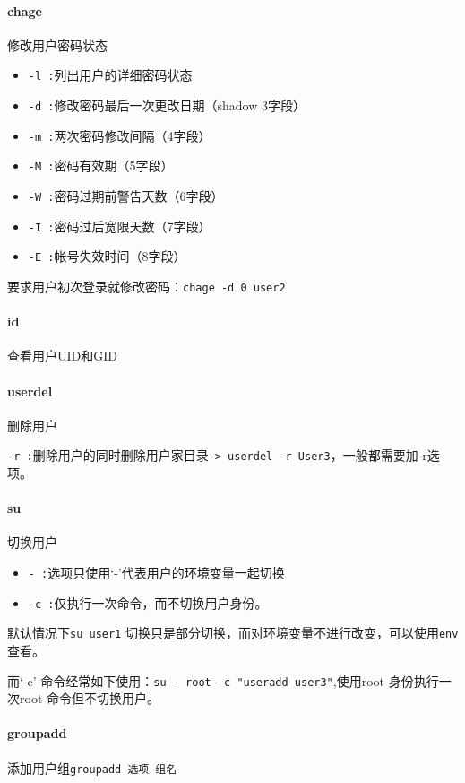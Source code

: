 \documentclass[UTF8,a4paper,12pt]{ctexbook}
\begin{document}
			\paragraph{chage} 修改用户密码状态
				\begin{itemize}[itemindent = 1em]
					\item \verb|-l :|列出用户的详细密码状态
					\item \verb|-d :|修改密码最后一次更改日期（shadow 3字段）
					\item \verb|-m :|两次密码修改间隔（4字段）
					\item \verb|-M :|密码有效期（5字段）
					\item \verb|-W :|密码过期前警告天数（6字段）
					\item \verb|-I :|密码过后宽限天数（7字段）
					\item \verb|-E :|帐号失效时间（8字段）
				\end{itemize}
			
				要求用户初次登录就修改密码：\verb|chage -d 0 user2|
			
			\paragraph{id} 查看用户UID和GID
			
			\paragraph{userdel} 删除用户
				
				\verb|-r :|删除用户的同时删除用户家目录\verb|-> userdel -r User3|，一般都需要加-r选项。
				
			\paragraph{su} 切换用户
				\begin{itemize}
					\item \verb|- :|选项只使用‘-’代表用户的环境变量一起切换
					\item \verb|-c :|仅执行一次命令，而不切换用户身份。
				\end{itemize}
				
				默认情况下\verb|su user1| 切换只是部分切换，而对环境变量不进行改变，可以使用\verb|env |查看。
				
				而‘-c’ 命令经常如下使用：\verb|su - root -c "useradd user3"|,使用root 身份执行一次root 命令但不切换用户。
				
			\paragraph{groupadd} 添加用户组\verb|groupadd 选项 组名|
				
\end{document}
